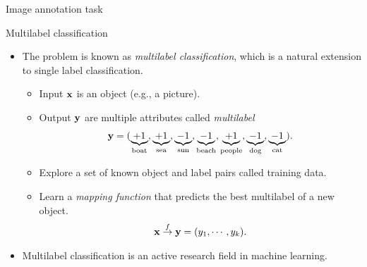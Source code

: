 \documentclass[first=purple,second=dgreen,logo=redexc]{aaltoslides}
\begin{document}
{\begin{frame}{Image annotation task}
{\begin{center}
	\end{center}
	}
\end{frame}


\begin{frame}{Multilabel classification}
	\begin{itemize}
		\item The problem is known as \textit{multilabel classification}, which is a natural extension to single label classification.
		\begin{itemize}
			\footnotesize
			\item Input $\mathbf {x}$ is an object (e.g., a picture).
			\item Output $\mathbf {y}$ are multiple attributes called \textit{multilabel}
			\begin{align*}
\mathbf {y}=(\underbrace{+1}_{\text{boat}},\underbrace{+1}_{\text{sea}},\underbrace{-1}_{\text{sun}},\underbrace{-1}_{\text{beach}},\underbrace{+1}_{\text{people}},\underbrace{-1}_{\text{dog}},\underbrace{-1}_{\text{cat}}).
			\end{align*}
			\item Explore a set of known object and label pairs called {training data}.
			\item Learn a \textit{mapping function} that predicts the best multilabel of a new object.
			\begin{align*}
				\mathbf {x}\overset{f}{\rightarrow}\mathbf {y}=(y_1,\cdots,y_k).
			\end{align*}
		\end{itemize}
		\item Multilabel classification is an active research field in machine learning.
	\end{itemize}
\end{frame}

}
\end{document}
